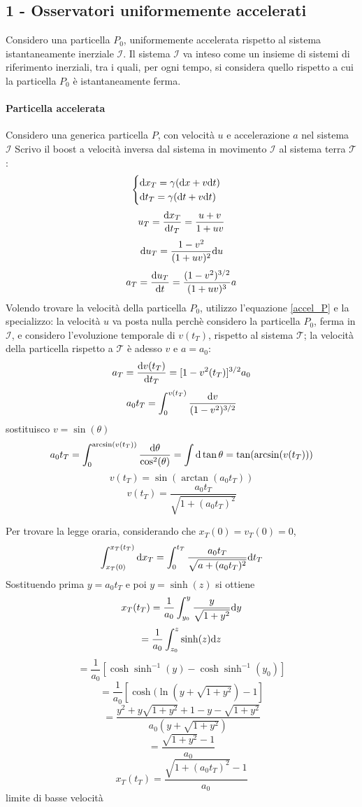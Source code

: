 \subsection{1 - Osservatori uniformemente accelerati}
Considero una particella $P_0$, uniformemente accelerata rispetto al sistema istantaneamente inerziale  $\mathcal{I}$.
Il sistema $\mathcal{I}$ va inteso come un insieme di sistemi di riferimento inerziali, tra i quali, per ogni tempo, si considera quello rispetto a cui la particella $P_0$ \`e istantaneamente ferma.
\paragraph{Particella accelerata}
Considero una generica particella $P$, con velocit\`a $u$ e accelerazione $a$ nel sistema $\mathcal{I}$
Scrivo il boost a velocit\`a inversa dal sistema in movimento $\mathcal{I}$ al sistema terra $\mathcal{T}$:
\begin{equation}
	\begin{cases}
		\mathrm{d} x_T = \gamma (\mathrm{d} x + v \mathrm{d} t) &  \\
		\mathrm{d} t_T = \gamma (\mathrm{d} t + v \mathrm{d} t) &  \\ 
	\end{cases}
\end{equation}
\[  u_T = \frac{\mathrm{d} x_T}{\mathrm{d} t_T} = \frac{u+v}{1+uv} \]
\[ \mathrm{d} u_T = \frac{1-v^2}{(1+uv)^2} \mathrm{d} u \]
\begin{equation} \label{accel_P}
	a_T = \frac{\mathrm{d} u_T}{\mathrm{d} t} = \frac{(1-v^2)^{3/2}}{(1+uv)^3} a 
\end{equation}
Volendo trovare la velocit\`a della particella $P_0$, utilizzo l'equazione \ref{accel_P} e la specializzo: la velocit\`a $u$ va posta nulla perch\`e considero la particella $P_0$, ferma in $\mathcal{I}$, e considero l'evoluzione temporale di $v(t_T)$, rispetto al sistema $\mathcal{T}$; la velocit\`a della particella rispetto a $\mathcal{T}$ \`e adesso $v$ e \( a = a_0 \):
\[ a_T = \frac{\mathrm{d} v(t_T)}{\mathrm{d} t_T} = [1-v^2(t_T)]^{3/2} a_0 \]
\[ a_0t_T = \int_0^{v(t_T)} \frac{\mathrm{d} v}{(1-v^2)^{3/2}} \]
sostituisco $v=\sin(\theta)$
\[ a_0t_T= \int_0^{\arcsin(v(t_T))} \frac{\mathrm{d} \theta}{\cos^2(\theta)} = \int \mathrm{d}\tan\theta = \tan(\arcsin(v(t_T))) \]
\[ v(t_T) = \sin(\arctan(a_0t_T)) \]
\begin{equation} \label{veloc}
		v(t_T) = \frac{a_0 t_T}{\sqrt{1+(a_0t_T)^2}} 
\end{equation}

Per trovare la legge oraria, considerando che \(x_T(0)=v_T(0)=0\),
\[ \int_{x_T(0)}^{x_T(t_T)} \mathrm{d} x_T = \int_0^{t_T} \frac{a_0t_T}{\sqrt{a+(a_0t_T)^2}} \mathrm{d} t_T \]
Sostituendo prima \( y=a_0t_T \) e poi \( y = \sinh(z) \) si ottiene
\[ x_T(t_T) = \frac{1}{a_0} \int_{y_0}^y \frac{y}{\sqrt{1+y^2}} \mathrm{d} y \]
\[ = \frac{1}{a_0} \int_{z_0}^z \sinh(z) \mathrm{d} z \]	
\[ = \frac{1}{a_0} [\cosh\sinh^{-1}(y) - \cosh\sinh^{-1}(y_0)] \]
\[ = \frac{1}{a_0} [\cosh(\ln(y + \sqrt{1+y^2}) -1] \]
\[ = \frac{y^2+y\sqrt{1+y^2}+1-y-\sqrt{1+y^2}}{a_0(y+\sqrt{1+y^2})} \]
\[ = \frac{\sqrt{1+y^2}-1}{a_0} \]
\begin{equation} \label{leggeoraria}
	x_T(t_T) = \frac{\sqrt{1+(a_0t_T)^2}-1}{a_0} 
\end{equation}
\todo limite di basse velocit\`a

